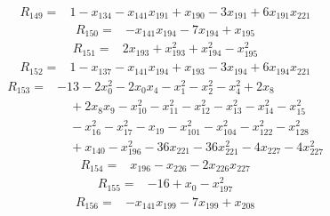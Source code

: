 \begin{equation*}\begin{split}
R_{149}={}&1 - x_{134} - x_{141} x_{191} + x_{190} - 3x_{191} + 6x_{191} x_{221}
\end{split}\end{equation*}
\begin{equation*}\begin{split}
R_{150}={}&-x_{141} x_{194} - 7x_{194} + x_{195}
\end{split}\end{equation*}
\begin{equation*}\begin{split}
R_{151}={}&2x_{193} + x_{193}^{2} + x_{194}^{2} - x_{195}^{2}
\end{split}\end{equation*}
\begin{equation*}\begin{split}
R_{152}={}&1 - x_{137} - x_{141} x_{194} + x_{193} - 3x_{194} + 6x_{194} x_{221}
\end{split}\end{equation*}
\begin{equation*}\begin{split}
R_{153}={}&-13 - 2x_{0}^{2} - 2x_{0} x_{4} - x_{1}^{2} - x_{2}^{2} - x_{4}^{2} + 2x_{8}\\
&\quad + 2x_{8} x_{9} - x_{10}^{2} - x_{11}^{2} - x_{12}^{2} - x_{13}^{2} - x_{14}^{2} - x_{15}^{2}\\
&\quad -x_{16}^{2} - x_{17}^{2} - x_{19} - x_{101}^{2} - x_{104}^{2} - x_{122}^{2} - x_{128}^{2}\\
&\quad + x_{140} - x_{196}^{2} - 36x_{221} - 36x_{221}^{2} - 4x_{227} - 4x_{227}^{2}
\end{split}\end{equation*}
\begin{equation*}\begin{split}
R_{154}={}&x_{196} - x_{226} - 2x_{226} x_{227}
\end{split}\end{equation*}
\begin{equation*}\begin{split}
R_{155}={}&-16 + x_{0} - x_{197}^{2}
\end{split}\end{equation*}
\begin{equation*}\begin{split}
R_{156}={}&-x_{141} x_{199} - 7x_{199} + x_{208}
\end{split}\end{equation*}
